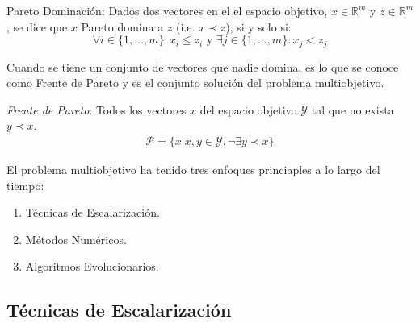 \begin{definition}{Pareto Dominaci\'on:}
    Dados dos vectores en el el espacio objetivo, $x \in \mathbb{R}^m$ y $z \in \mathbb{R}^m$, se dice que $x$ Pareto domina a $z$ (i.e. $x \prec z$), si y solo si:
    \begin{equation*}
        \forall i \in \{1, ..., m\}: x_i \leq z_i \text{ y } \exists j \in \{1, ..., m\}: x_j < z_j
    \end{equation*}
\end{definition}

Cuando se tiene un conjunto de vectores que nadie domina, es lo que se conoce como Frente de Pareto y es el conjunto soluci\'on del problema multiobjetivo.

\begin{definition}
    \textit{Frente de Pareto}: Todos los vectores $x$ del espacio objetivo $\mathcal{Y}$ tal que no exista $y \prec x$.
    \begin{align*}
        \mathcal{P} = \{x| x, y \in \mathcal{Y}, \neg \exists y \prec x \} 
    \end{align*}
\end{definition}



El problema multiobjetivo ha tenido tres enfoques princiaples a lo largo del tiempo:
\begin{enumerate}
    \item T\'ecnicas de Escalarizaci\'on.
    \item M\'etodos Num\'ericos.
    \item Algoritmos Evolucionarios.
\end{enumerate}



\subsection{T\'ecnicas de Escalarizaci\'on }

